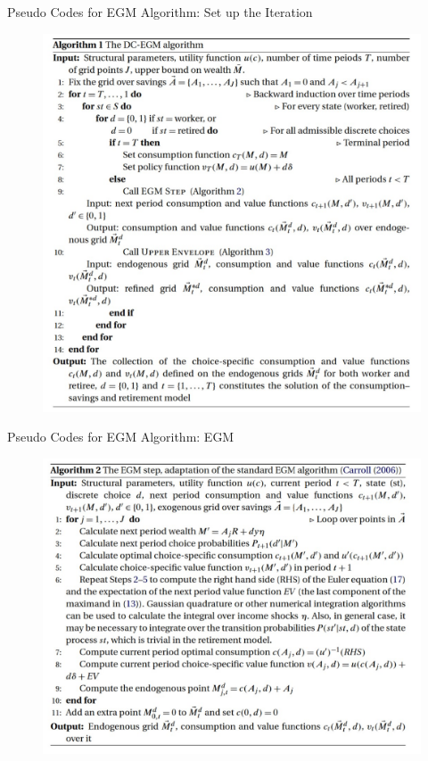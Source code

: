 \documentclass[aspectratio=169]{beamer}
\begin{document}
\begin{frame}{Pseudo Codes for EGM Algorithm: Set up the Iteration}
	\begin{figure}
		\includegraphics[scale=0.45]{algorithm1.jpg}
	\end{figure}
\end{frame}

\begin{frame}{Pseudo Codes for EGM Algorithm: EGM}
	\begin{figure}
		\includegraphics[scale=0.5]{algorithm2.jpg}
	\end{figure}
\end{frame}
\end{document}
